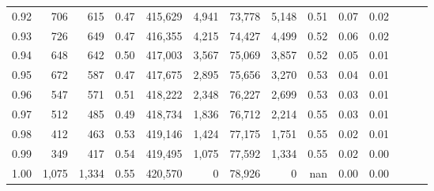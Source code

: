 \begin{tabular}{rrrrrrrrrrrrrr}
0.92 &    706 &    615 &  0.47 &  415,629 &    4,941 &  73,778 &   5,148 &  0.51 &  0.07 &      0.02 \\
0.93 &    726 &    649 &  0.47 &  416,355 &    4,215 &  74,427 &   4,499 &  0.52 &  0.06 &      0.02 \\
0.94 &    648 &    642 &  0.50 &  417,003 &    3,567 &  75,069 &   3,857 &  0.52 &  0.05 &      0.01 \\
0.95 &    672 &    587 &  0.47 &  417,675 &    2,895 &  75,656 &   3,270 &  0.53 &  0.04 &      0.01 \\
0.96 &    547 &    571 &  0.51 &  418,222 &    2,348 &  76,227 &   2,699 &  0.53 &  0.03 &      0.01 \\
0.97 &    512 &    485 &  0.49 &  418,734 &    1,836 &  76,712 &   2,214 &  0.55 &  0.03 &      0.01 \\
0.98 &    412 &    463 &  0.53 &  419,146 &    1,424 &  77,175 &   1,751 &  0.55 &  0.02 &      0.01 \\
0.99 &    349 &    417 &  0.54 &  419,495 &    1,075 &  77,592 &   1,334 &  0.55 &  0.02 &      0.00 \\
1.00 &  1,075 &  1,334 &  0.55 &  420,570 &        0 &  78,926 &       0 &   nan &  0.00 &      0.00 \\
\bottomrule
\end{tabular}
